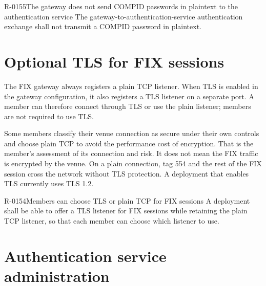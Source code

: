 \begin{requirement}{R-0155}{The gateway does not send COMPID passwords in plaintext to the authentication service}
  The gateway-to-authentication-service authentication exchange shall not
  transmit a COMPID password in plaintext.
\end{requirement}

\section{Optional TLS for FIX sessions}
\label{sec:security:fix_tls}

The FIX gateway always registers a plain TCP listener. When TLS is enabled in
the gateway configuration, it also registers a TLS listener on a separate
port. A member can therefore connect through TLS or use the plain listener;
members are not required to use TLS.

Some members classify their venue connection as secure under their own
controls and choose plain TCP to avoid the performance cost of encryption.
That is the member's assessment of its connection and risk. It does not mean
the FIX traffic is encrypted by the venue. On a plain connection, tag 554 and
the rest of the FIX session cross the network without TLS protection. A
deployment that enables TLS currently uses TLS 1.2.

\begin{requirement}{R-0154}{Members can choose TLS or plain TCP for FIX sessions}
  A deployment shall be able to offer a TLS listener for FIX sessions while
  retaining the plain TCP listener, so that each member can choose which
  listener to use.
\end{requirement}

\section{Authentication service administration}
\label{sec:security:authentication_service_admin}

